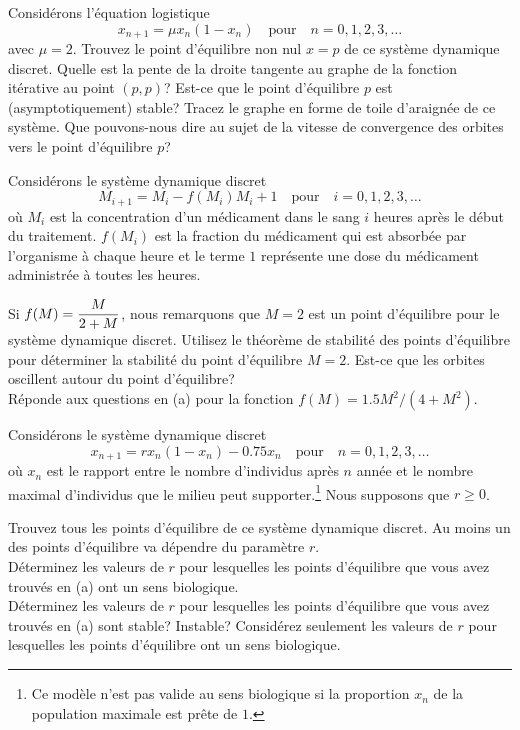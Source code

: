 \begin{question}[\life]
Considérons l'équation logistique
\[
x_{n+1} = \mu x_n ( 1- x_n) \quad \text{pour} \quad n=0, 1, 2, 3, \ldots
\]
avec $\mu = 2$.  Trouvez le point d'équilibre non nul $x=p$ de ce
système dynamique discret.  Quelle est la pente de la droite tangente
au graphe de la fonction itérative au point $(p,p)$?  Est-ce que le
point d'équilibre $p$ est (asymptotiquement) stable?  Tracez le graphe
en forme de toile d'araignée de ce système.  Que pouvons-nous dire au
sujet de la vitesse de convergence des orbites vers le point
d'équilibre $p$?
\label{6Q105}
\end{question}

\begin{question}[\life]
Considérons le système dynamique discret
\[
M_{i+1} = M_i - f(M_i) M_i + 1 \quad \text{pour} \quad i =0, 1, 2, 3, \ldots
\]
où $M_i$ est la concentration d'un médicament dans le sang $i$ heures après
le début du traitement.  $f(M_i)$ est la fraction du médicament qui est
absorbée par l'organisme à chaque heure et le terme $1$ représente une dose
du médicament administrée à toutes les heures.

 Si $\displaystyle f(M) = \frac{M}{2+M}$, nous remarquons que
$M=2$ est un point d'équilibre pour le système dynamique discret.
Utilisez le théorème de stabilité des points d'équilibre pour
déterminer la stabilité du point d'équilibre $M=2$.  Est-ce que les
orbites oscillent autour du point d'équilibre?\\
 Réponde aux questions en (a) pour la fonction
$f(M) = 1.5 M^2/(4+M^2)$.
\label{6Q106}
\end{question}

\begin{question}[\life]
Considérons le système dynamique discret
\[
x_{n+1} = rx_n (1-x_n) - 0.75 x_n \quad \text{pour} \quad n=0, 1, 2,
3, \ldots
\]
où $x_n$ est le rapport entre le nombre d'individus après $n$ année et le
nombre maximal d'individus que le milieu peut supporter.\footnote{Ce modèle
n'est pas valide au sens biologique si la proportion $x_n$ de la
population maximale est prête de $1$.}  Nous supposons que
$r\geq 0$.

 Trouvez tous les points d'équilibre de ce système dynamique
discret.  Au moins un des points d'équilibre va dépendre du paramètre
$r$.\\
 Déterminez les valeurs de $r$ pour lesquelles les points
d'équilibre que vous avez trouvés en (a) ont un sens biologique.\\
 Déterminez les valeurs de $r$ pour lesquelles les points
d'équilibre que vous avez trouvés en (a) sont stable? Instable?
Considérez seulement les valeurs de $r$ pour lesquelles les points
d'équilibre ont un sens biologique.
\label{6Q107}
\end{question}

